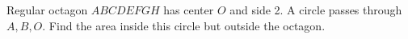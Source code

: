 Regular octagon $ABCDEFGH$ has center $O$ and side 2. A circle passes through $A,B,O$. Find the area inside this circle but outside the octagon.

